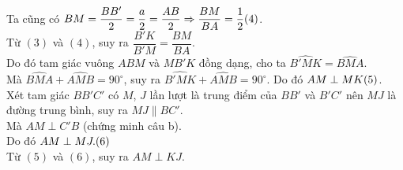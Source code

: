 \begin{vd}
{\begin{enumerate}[a)]
			Ta cũng có $BM = \dfrac{BB'}{2} = \dfrac{a}{2} = \dfrac{AB}{2} \Rightarrow \dfrac{BM}{BA} = \dfrac{1}{2}\hfill(4)$.\\
			Từ $(3)$ và $(4)$, suy ra $\dfrac{B'K}{B'M} = \dfrac{BM}{BA}$. \\
			Do đó tam giác vuông $ABM$ và $MB'K$ đồng dạng, cho ta $\widehat{B'MK} = \widehat{BMA}.$\\
			Mà $\widehat{BMA} + \widehat{AMB} = 90^\circ$, suy ra $\widehat{B'MK} + \widehat{AMB} = 90^\circ$. Do đó $AM \perp MK\hfill(5)$. 	\\			 
			Xét tam giác $BB'C'$ có $M$, $J$ lần lượt là trung điểm của  $BB'$ và $B'C'$ nên $MJ$ là đường trung bình, suy ra $MJ \parallel BC'$.\\ Mà $AM \perp C'B$ (chứng minh câu b). \\
			Do đó $AM \perp MJ. \hfill(6)$\\
			Từ $(5)$ và $(6)$, suy ra $AM \perp KJ.$ 
		\end{enumerate}
	}
\end{vd}
